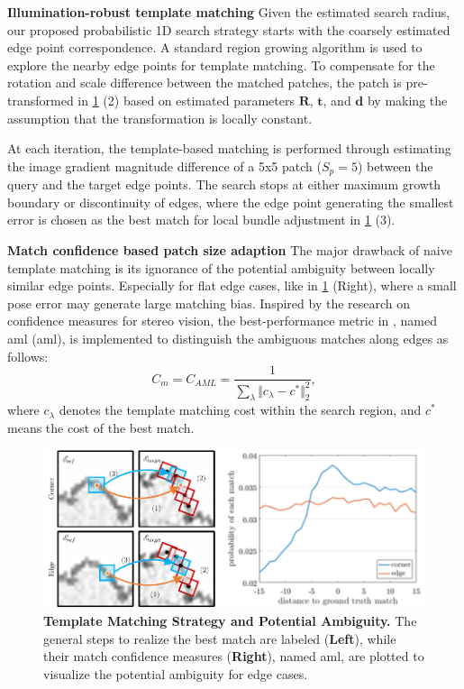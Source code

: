 \noindent \textbf{Illumination-robust template matching}
Given the estimated search radius, our proposed probabilistic 1D search strategy starts with the coarsely estimated edge point correspondence. 
A standard region growing algorithm is used to explore the nearby edge points for template matching. 
To compensate for the rotation and scale difference between the matched patches, the patch is pre-transformed in \ref{fig:edge_ambiguity} (2) based on estimated parameters $\mathbf{R}$, $\mathbf{t}$, and $\mathbf{d}$ by making the assumption that the transformation is locally constant. 

At each iteration, the template-based matching is performed through estimating the image gradient magnitude difference of a 5x5 patch ($S_p = 5$) between the query and the target edge points. 
The search stops at either maximum growth boundary or discontinuity of edges, where the edge point generating the smallest error is chosen as the best match for local bundle adjustment in \ref{fig:edge_ambiguity} (3). 

\noindent \textbf{Match confidence based patch size adaption}
The major drawback of naive template matching is its ignorance of the potential ambiguity between locally similar edge points. Especially for flat edge cases, like in \ref{fig:edge_ambiguity} (Right), where a small pose error may generate large matching bias. Inspired by the research on confidence measures for stereo vision, the best-performance metric in \cite{hu2012quantitative}, named \acrlong{aml} (\acrshort{aml}), is implemented to distinguish the ambiguous matches along edges as follows:
\begin{equation} \label{eq:edge_amlconfidence} 
C_{m} = C_{AML} = \frac{1}{\sum_{\lambda} \Vert c_{\lambda} - c^* \Vert_2^2}, 
\end{equation}
where $c_{\lambda}$ denotes the template matching cost within the search region, and $c^*$ means the cost of the best match. 

\begin{figure}[t] 
  	\centering
  	\includegraphics[width=0.8\linewidth]{figures/illumination/edge_ambiguity.pdf}
    \caption[Template Matching Strategy and Potential Ambiguity]{ \textbf{Template Matching Strategy and Potential Ambiguity.} The general steps to realize the best match are labeled (\textbf{Left}), while their match confidence measures (\textbf{Right}), named \acrlong{aml}, are plotted to visualize the potential ambiguity for edge cases.}
\label{fig:edge_ambiguity}
%
\end{figure}

